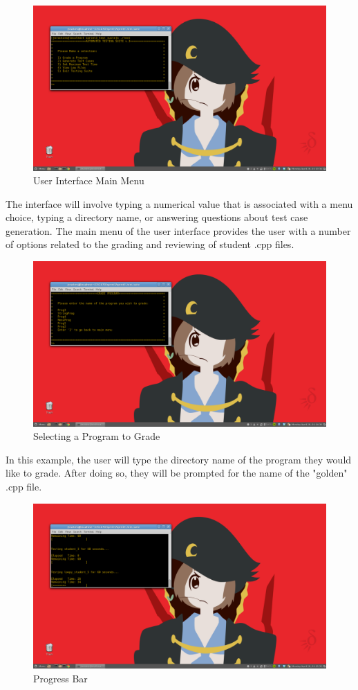 \documentclass {article}
\begin{document}
		 	\begin{figure}[h!]
				\centering
				\includegraphics[width=0.6\linewidth]{mainmenu.png}
				\caption{User Interface Main Menu}
				\label{fig:main_Menu}
			\end{figure}
			
			The interface will involve typing a numerical value that is associated with a menu
			 choice, typing a directory name, or answering questions about test case generation.
			 The main menu of the user interface provides the user with a number of options related
			 to the grading and reviewing of student .cpp files.
			
					 	 
		 	\begin{figure}[h!]
				\centering
				\includegraphics[width=0.6\linewidth]{gradeprog.png}
				\caption{Selecting a Program to Grade}
				\label{fig:grading_Program}
			\end{figure} 
			
			In this example, the user will type the directory name of the program they would like
			 to grade. After doing so, they will be prompted for the name of the "golden" .cpp 
			 file. 
			 
		 	\begin{figure}[h!]
				\centering
				\includegraphics[width=0.6\linewidth]{progbar.png}
				\caption{Progress Bar}
				\label{fig:progbar}
			\end{figure}
			
\end{document}
